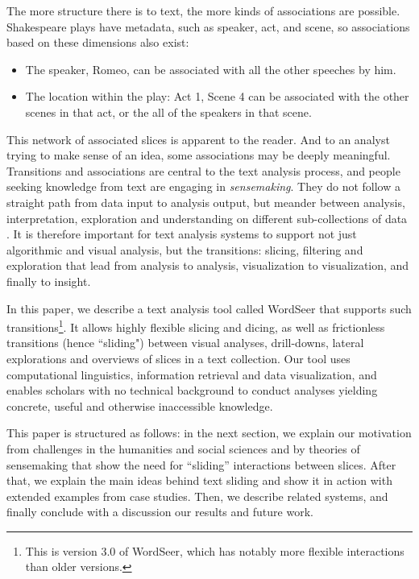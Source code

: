 \documentclass{sig-alternate}
\begin{document}
The more structure there is to text, the more kinds of associations are possible. Shakespeare plays have metadata, such as speaker, act, and scene, so associations based on these dimensions also exist:
\begin{itemize}
\item The speaker, Romeo, can be associated with all the other speeches by him.
\item The location within the play: Act 1, Scene 4 can be associated with the other scenes in that act, or the all of the speakers in that scene.
\end{itemize}

This network of associated slices is apparent to the reader. And to an analyst trying to make sense of an idea, some associations may be deeply meaningful.  Transitions  and associations are central to the text analysis process, and people seeking knowledge from text are engaging in \emph{sensemaking}. They do not follow a straight path from data input to analysis output, but meander between analysis, interpretation, exploration and understanding on different sub-collections of data \cite{russell_cost_1993, pirolli_sensemaking_2005}.  It is therefore important for text analysis systems to support not just algorithmic and visual analysis, but the transitions: slicing, filtering and exploration that lead from analysis to analysis, visualization to visualization, and finally to insight.

In this paper, we describe a text analysis tool called WordSeer that supports such transitions\footnote{This is version 3.0 of WordSeer, which has notably more flexible interactions than older versions.}.  It allows highly flexible slicing and dicing, as well as frictionless transitions (hence ``sliding") between visual analyses, drill-downs, lateral explorations and overviews of slices in a text collection. Our tool uses computational linguistics, information retrieval and data visualization, and enables scholars with no technical background to conduct analyses yielding concrete, useful and otherwise inaccessible knowledge. 

This paper is structured as follows: in the next section, we explain our motivation from challenges in the  humanities and social sciences and by theories of sensemaking that show the need for ``sliding'' interactions between slices. After that, we explain the main ideas behind text sliding and show it in action with extended examples from case studies. Then, we describe related systems, and finally conclude with a discussion our results and future work.
\end{document}
